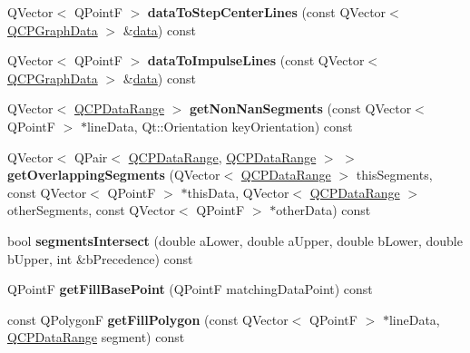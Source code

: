 \begin{DoxyCompactItemize}
\item 
\mbox{\label{classQCPGraph_a238116f1898c49cb8209d61707b5b367}} 
Q\+Vector$<$ Q\+PointF $>$ {\bfseries data\+To\+Step\+Center\+Lines} (const Q\+Vector$<$ \hyperlink{classQCPGraphData}{Q\+C\+P\+Graph\+Data} $>$ \&\hyperlink{classQCPGraph_a141aa31a1f19bbd0ce60f55eaeb9ea60}{data}) const
\item 
\mbox{\label{classQCPGraph_a2a958a5c6a6e1e4a03556be88b6fe37e}} 
Q\+Vector$<$ Q\+PointF $>$ {\bfseries data\+To\+Impulse\+Lines} (const Q\+Vector$<$ \hyperlink{classQCPGraphData}{Q\+C\+P\+Graph\+Data} $>$ \&\hyperlink{classQCPGraph_a141aa31a1f19bbd0ce60f55eaeb9ea60}{data}) const
\item 
\mbox{\label{classQCPGraph_a0e0886b9ec7731d8993bbb104465f3b9}} 
Q\+Vector$<$ \hyperlink{classQCPDataRange}{Q\+C\+P\+Data\+Range} $>$ {\bfseries get\+Non\+Nan\+Segments} (const Q\+Vector$<$ Q\+PointF $>$ $\ast$line\+Data, Qt\+::\+Orientation key\+Orientation) const
\item 
\mbox{\label{classQCPGraph_a334b15c43ee1855bf724daf886e8530e}} 
Q\+Vector$<$ Q\+Pair$<$ \hyperlink{classQCPDataRange}{Q\+C\+P\+Data\+Range}, \hyperlink{classQCPDataRange}{Q\+C\+P\+Data\+Range} $>$ $>$ {\bfseries get\+Overlapping\+Segments} (Q\+Vector$<$ \hyperlink{classQCPDataRange}{Q\+C\+P\+Data\+Range} $>$ this\+Segments, const Q\+Vector$<$ Q\+PointF $>$ $\ast$this\+Data, Q\+Vector$<$ \hyperlink{classQCPDataRange}{Q\+C\+P\+Data\+Range} $>$ other\+Segments, const Q\+Vector$<$ Q\+PointF $>$ $\ast$other\+Data) const
\item 
\mbox{\label{classQCPGraph_abb9c674b207a1f6df5e083aa9f3e071a}} 
bool {\bfseries segments\+Intersect} (double a\+Lower, double a\+Upper, double b\+Lower, double b\+Upper, int \&b\+Precedence) const
\item 
\mbox{\label{classQCPGraph_a13f2c756f3114703159c2e604783e208}} 
Q\+PointF {\bfseries get\+Fill\+Base\+Point} (Q\+PointF matching\+Data\+Point) const
\item 
\mbox{\label{classQCPGraph_af73d5fe97cde966785bfd67201e44391}} 
const Q\+PolygonF {\bfseries get\+Fill\+Polygon} (const Q\+Vector$<$ Q\+PointF $>$ $\ast$line\+Data, \hyperlink{classQCPDataRange}{Q\+C\+P\+Data\+Range} segment) const

\end{DoxyCompactItemize}
